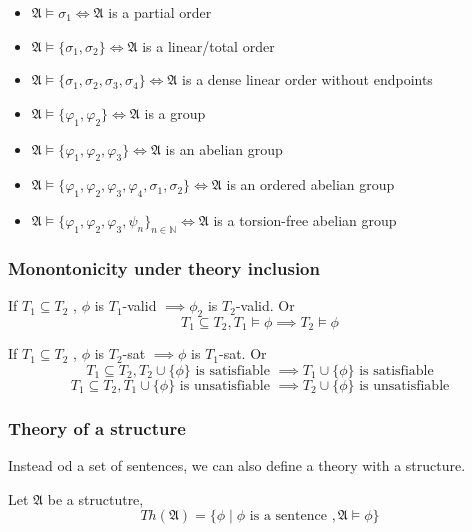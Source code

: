 \documentclass{article}
\newtheorem{definition}[theorem]{Definition}
\let\olddefinition\definition
\let\endolddefinition\enddefinition
\renewenvironment{definition}
  {\begin{tcolorbox}[
      colback=red!10,
      colframe=red!50!black,
      boxrule=0.6pt,
      arc=2pt,
      left=6pt,right=6pt,top=4pt,bottom=4pt,
      breakable
    ]\olddefinition}
  {\endolddefinition\end{tcolorbox}}
\newtheorem{lemma}[theorem]{Lemma}
\let\oldlemma\lemma
\let\endoldlemma\endlemma
\renewenvironment{lemma}
  {\begin{tcolorbox}[
      colback=green!8,
      colframe=green!50!black,
      boxrule=0.6pt,
      arc=2pt,
      left=6pt,right=6pt,top=4pt,bottom=4pt
    ]\oldlemma}
  {\endoldlemma\end{tcolorbox}}
\begin{document}
\begin{itemize}
    \item $\mathfrak{A} \models \sigma_1 \iff \mathfrak{A}$ is a partial order
    \item $\mathfrak{A} \models \{\sigma_1, \sigma_2\} \iff \mathfrak{A}$ is a linear/total order
    \item $\mathfrak{A} \models \{\sigma_1, \sigma_2, \sigma_3, \sigma_4\} \iff \mathfrak{A}$ is a dense linear order without endpoints
    \item $\mathfrak{A} \models \{\varphi_1, \varphi_2\} \iff \mathfrak{A}$ is a group
    \item $\mathfrak{A} \models \{\varphi_1, \varphi_2, \varphi_3\} \iff \mathfrak{A}$ is an abelian group
    \item $\mathfrak{A} \models \{\varphi_1, \varphi_2, \varphi_3, \varphi_4, \sigma_1, \sigma_2\} \iff \mathfrak{A}$ is an ordered abelian group
    \item $\mathfrak{A} \models \{\varphi_1, \varphi_2, \varphi_3, \psi_n\}_{n \in \mathbb{N}} \iff \mathfrak{A}$ is a torsion-free abelian group
\end{itemize}
\subsubsection{Monontonicity under theory inclusion}
\begin{lemma}
    If $T_1 \subseteq T_2$ , $\phi$ is $T_1$-valid $\implies \phi_2$ is $T_2$-valid. Or
    \[T_1 \subseteq T_2, T_1 \models \phi \implies T_2 \models \phi\]
\end{lemma}
\begin{lemma}
    If $T_1 \subseteq T_2$ , $\phi$ is $T_2$-sat $\implies \phi$ is $T_1$-sat. Or
    \[T_1 \subseteq T_2, T_2 \cup \{\phi\} \text{ is satisfiable } \implies T_1 \cup \{\phi\} \text{ is satisfiable}\]
    \[T_1 \subseteq T_2, T_1 \cup \{\phi\} \text{ is unsatisfiable } \implies T_2 \cup \{\phi\} \text{ is unsatisfiable}\]
\end{lemma}
\subsubsection{Theory of a structure}
Instead od a set of sentences, we can also define a theory with a structure. 
\begin{definition}
    Let $\mathfrak{A}$ be a structutre, 
    \[Th(\mathfrak{A}) = \{\phi \mid \phi \text{ is a sentence }, \mathfrak{A} \models \phi\}\]
\end{definition}
\end{document}
